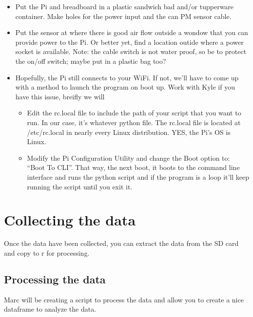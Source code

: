 \documentclass{article}\usepackage[]{graphicx}\usepackage[]{color}
\begin{document}
\begin{itemize}
  \item Put the Pi and breadboard in a plastic sandwich bad and/or tupperware container. Make holes for the power input and the can PM sensor cable. 
  \item Put the sensor at where there is good air flow outside a wondow that you can provide power to the Pi. Or better yet, find a location outide where a power socket is available.  Note: the cable switch is not water proof, so be to protect the on/off switch; maybe put in a plastic bag too?
  \item Hopefully, the Pi still connects to your WiFi. If not, we'll have to come up with a method to launch the program on boot up. Work with Kyle if you have this issue, breifly we will 
  
\begin{itemize}
  \item Edit the rc.local file to include the path of your script that you want to run. In our case, it's whatever python file. The rc.local file is located at /etc/rc.local in nearly every Linux distribution. YES, the Pi's OS is Linux.
  \item Modify the Pi Configuration Utility and change the Boot option to: ``Boot To CLI''. That way, the next boot, it boots to the command line interface and runs the python script and if the program is a loop it'll keep running the script until you exit it.
  
\end{itemize}


\end{itemize}


\section{Collecting the data}

Once the data have been collected, you can extract the data from the SD card and copy to r for processing. 

\subsection{Processing the data}

Marc will be creating a script to process the data and allow you to create a nice dataframe to analyze the data.
\end{document}
